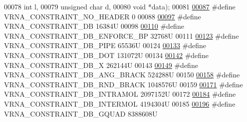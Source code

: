\begin{DoxyCode}
00078                                                   \textcolor{keywordtype}{int}           l,
00079                                                   \textcolor{keywordtype}{unsigned} \textcolor{keywordtype}{char} d,
00080                                                   \textcolor{keywordtype}{void}          *data);
00081 
\hyperlink{constraints__hard_8h_a08d12a9a846ea593b7171d277c9f033f}{00087} \textcolor{preprocessor}{#define VRNA\_CONSTRAINT\_NO\_HEADER         0}
00088 
\hyperlink{group__hard__constraints_ga4bfc2f15c4f261c62a11af9d2aa80c90}{00097} \textcolor{preprocessor}{#define VRNA\_CONSTRAINT\_DB                16384U}
00098 
\hyperlink{group__hard__constraints_ga29ebe940110d60ab798fdacbcdbbfb7d}{00110} \textcolor{preprocessor}{#define VRNA\_CONSTRAINT\_DB\_ENFORCE\_BP           32768U}
00111 
\hyperlink{group__hard__constraints_ga13053547a2de5532b64b64d35e097ae1}{00123} \textcolor{preprocessor}{#define VRNA\_CONSTRAINT\_DB\_PIPE              65536U}
00124 
\hyperlink{group__hard__constraints_ga369bea82eae75fbe626f409fa425747e}{00133} \textcolor{preprocessor}{#define VRNA\_CONSTRAINT\_DB\_DOT               131072U}
00134 
\hyperlink{group__hard__constraints_ga7283bbe0f8954f7b030ecc3f2d1932b2}{00142} \textcolor{preprocessor}{#define VRNA\_CONSTRAINT\_DB\_X                 262144U}
00143 
\hyperlink{constraints__hard_8h_ad54c1315a47d55653dcaa5de6e544b77}{00149} \textcolor{preprocessor}{#define VRNA\_CONSTRAINT\_DB\_ANG\_BRACK         524288U}
00150 
\hyperlink{group__hard__constraints_gac17b034852c914bc5879954c65d7e74b}{00158} \textcolor{preprocessor}{#define VRNA\_CONSTRAINT\_DB\_RND\_BRACK         1048576U}
00159 
\hyperlink{group__hard__constraints_ga5c17253f5a39d1d49b0fb11f5196982a}{00171} \textcolor{preprocessor}{#define VRNA\_CONSTRAINT\_DB\_INTRAMOL    2097152U}
00172 
\hyperlink{group__hard__constraints_ga31d0ebb9755ca8a4acafc14f00ca755d}{00184} \textcolor{preprocessor}{#define VRNA\_CONSTRAINT\_DB\_INTERMOL    4194304U}
00185 
\hyperlink{group__hard__constraints_ga75cfab03cdc97c95b3ce8bb29f52b08e}{00196} \textcolor{preprocessor}{#define VRNA\_CONSTRAINT\_DB\_GQUAD                8388608U}

\end{DoxyCode}
